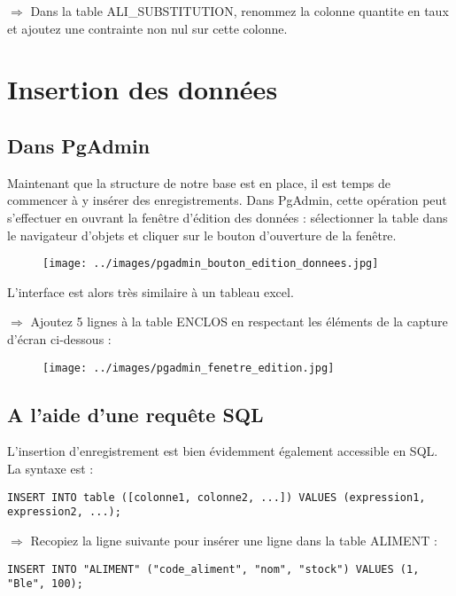 \documentclass[11pt]{article}
\begin{document}
				$\Rightarrow$ Dans la table ALI\_SUBSTITUTION, renommez la colonne quantite en taux et ajoutez une contrainte non nul sur cette colonne.
				
				
		\section{Insertion des données}
			\subsection{Dans PgAdmin}
				Maintenant que la structure de notre base est en place, il est temps de commencer à y insérer des enregistrements. Dans PgAdmin, cette opération peut s'effectuer en ouvrant la fenêtre d'édition des données : sélectionner la table dans le navigateur d'objets et cliquer sur le bouton d'ouverture de la fenêtre.
				
				\begin{figure}[H]
					\center \texttt{[image: ../images/pgadmin\_bouton\_edition\_donnees.jpg]}\\[1em]
				\end{figure}
				
				L'interface est alors très similaire à un tableau excel. 
				
				$\Rightarrow$ Ajoutez 5 lignes à la table ENCLOS en respectant les éléments de la capture d'écran ci-dessous :
				
				\begin{figure}[H]
					\center \texttt{[image: ../images/pgadmin\_fenetre\_edition.jpg]}\\[1em]
				\end{figure}
				
				
			\subsection{A l'aide d'une requête SQL}
				L'insertion d'enregistrement est bien évidemment également accessible en SQL. La syntaxe est :
				\begin{lstlisting}
INSERT INTO table ([colonne1, colonne2, ...]) VALUES (expression1, expression2, ...);
				\end{lstlisting}
				
				$\Rightarrow$ Recopiez la ligne suivante pour insérer une ligne dans la table ALIMENT :
				\begin{lstlisting}
INSERT INTO "ALIMENT" ("code_aliment", "nom", "stock") VALUES (1, "Ble", 100);
				\end{lstlisting}
				
\end{document}
